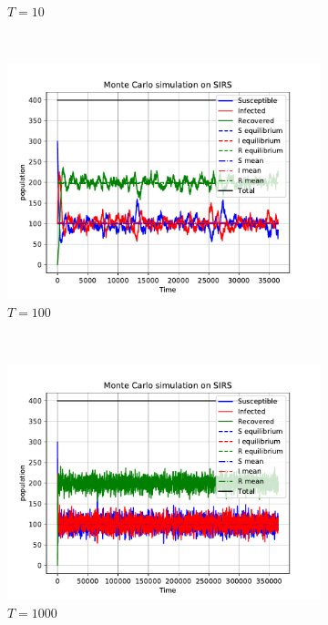 \begin{figure}[H]
\begin{subfigure}{0.49\textwidth}
         \caption{$T = 10$}
    \end{subfigure}
     ~ 
    \begin{subfigure}{0.49\textwidth}
         \centering
         \includegraphics[width=\linewidth]{../fig/newfig/MC_b1T100.pdf}
         \caption{$T = 100$}
    \end{subfigure}
     ~ 
    \begin{subfigure}{0.49\textwidth}
         \centering
         \includegraphics[width=\linewidth]{../fig/newfig/MC_b1T1000.pdf}
         \caption{$T = 1000$}
    \end{subfigure}
    \caption{}
    \label{fig:MCb1Tchanges}
\end{figure}

